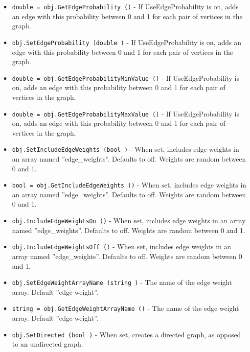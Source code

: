 \begin{itemize}
\item  \verb|double = obj.GetEdgeProbability ()| -  If UseEdgeProbability is on, adds an edge with this probability between 0 and 1
 for each pair of vertices in the graph.

\item  \verb|obj.SetEdgeProbability (double )| -  If UseEdgeProbability is on, adds an edge with this probability between 0 and 1
 for each pair of vertices in the graph.

\item  \verb|double = obj.GetEdgeProbabilityMinValue ()| -  If UseEdgeProbability is on, adds an edge with this probability between 0 and 1
 for each pair of vertices in the graph.

\item  \verb|double = obj.GetEdgeProbabilityMaxValue ()| -  If UseEdgeProbability is on, adds an edge with this probability between 0 and 1
 for each pair of vertices in the graph.

\item  \verb|obj.SetIncludeEdgeWeights (bool )| -  When set, includes edge weights in an array named ''edge\_weights''.
 Defaults to off.  Weights are random between 0 and 1.

\item  \verb|bool = obj.GetIncludeEdgeWeights ()| -  When set, includes edge weights in an array named ''edge\_weights''.
 Defaults to off.  Weights are random between 0 and 1.

\item  \verb|obj.IncludeEdgeWeightsOn ()| -  When set, includes edge weights in an array named ''edge\_weights''.
 Defaults to off.  Weights are random between 0 and 1.

\item  \verb|obj.IncludeEdgeWeightsOff ()| -  When set, includes edge weights in an array named ''edge\_weights''.
 Defaults to off.  Weights are random between 0 and 1.

\item  \verb|obj.SetEdgeWeightArrayName (string )| -  The name of the edge weight array. Default ''edge weight''.

\item  \verb|string = obj.GetEdgeWeightArrayName ()| -  The name of the edge weight array. Default ''edge weight''.

\item  \verb|obj.SetDirected (bool )| -  When set, creates a directed graph, as opposed to an undirected graph.


\end{itemize}
